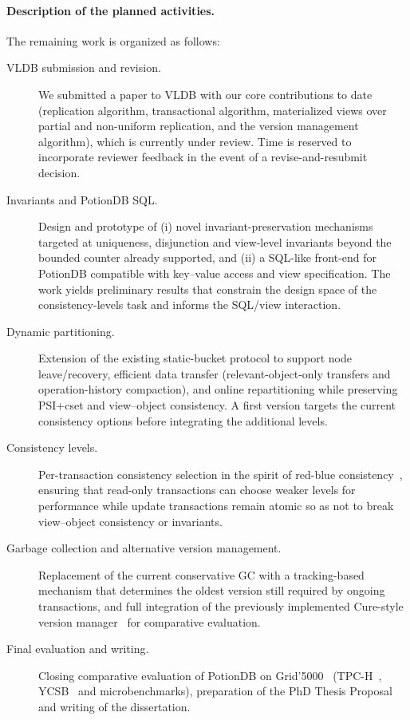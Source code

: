 \paragraph{Description of the planned activities.}
The remaining work is organized as follows:
\begin{description}
	\item[VLDB submission and revision.] We submitted a paper to VLDB with our core contributions to date (replication algorithm, transactional algorithm, materialized views over partial and non-uniform replication, and the version management algorithm), which is currently under review. Time is reserved to incorporate reviewer feedback in the event of a revise-and-resubmit decision.
	\item[Invariants and PotionDB SQL.] Design and prototype of (i) novel invariant-preservation mechanisms targeted at uniqueness, disjunction and view-level invariants beyond the bounded counter already supported, and (ii) a SQL-like front-end for PotionDB compatible with key--value access and view specification. The work yields preliminary results that constrain the design space of the consistency-levels task and informs the SQL/view interaction.
	\item[Dynamic partitioning.] Extension of the existing static-bucket protocol to support node leave/recovery, efficient data transfer (relevant-object-only transfers and operation-history compaction), and online repartitioning while preserving PSI+cset and view--object consistency. A first version targets the current consistency options before integrating the additional levels.
	\item[Consistency levels.] Per-transaction consistency selection in the spirit of red-blue consistency~\cite{li2012making}, ensuring that read-only transactions can choose weaker levels for performance while update transactions remain atomic so as not to break view--object consistency or invariants.
	\item[Garbage collection and alternative version management.] Replacement of the current conservative GC with a tracking-based mechanism that determines the oldest version still required by ongoing transactions, and full integration of the previously implemented Cure-style version manager~\cite{cure} for comparative evaluation.
	\item[Final evaluation and writing.] Closing comparative evaluation of PotionDB on Grid'5000~\cite{Grid5000} (TPC-H~\cite{tpch}, YCSB~\cite{ycsb} and microbenchmarks), preparation of the PhD Thesis Proposal and writing of the dissertation.
\end{description}

